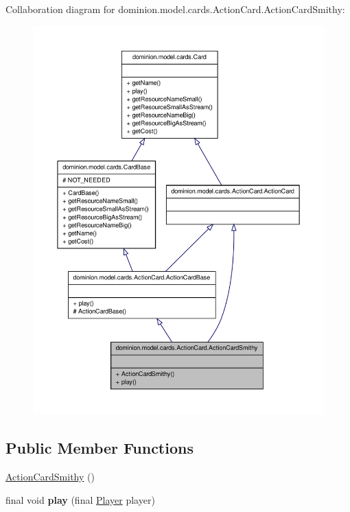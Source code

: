 \-Collaboration diagram for dominion.\-model.\-cards.\-Action\-Card.\-Action\-Card\-Smithy\-:
\nopagebreak
\begin{figure}[H]
\begin{center}
\leavevmode
\includegraphics[width=350pt]{classdominion_1_1model_1_1cards_1_1ActionCard_1_1ActionCardSmithy__coll__graph}
\end{center}
\end{figure}
\subsection*{\-Public \-Member \-Functions}
\begin{DoxyCompactItemize}
\item 
\hyperlink{classdominion_1_1model_1_1cards_1_1ActionCard_1_1ActionCardSmithy_aafcb756cc198e02e20b3823db78be610}{\-Action\-Card\-Smithy} ()
\item 
\hypertarget{classdominion_1_1model_1_1cards_1_1ActionCard_1_1ActionCardSmithy_a8e79e07d84ff194887a708d29b27716d}{final void {\bfseries play} (final \hyperlink{interfacedominion_1_1model_1_1Player}{\-Player} player)}\label{classdominion_1_1model_1_1cards_1_1ActionCard_1_1ActionCardSmithy_a8e79e07d84ff194887a708d29b27716d}

\end{DoxyCompactItemize}


